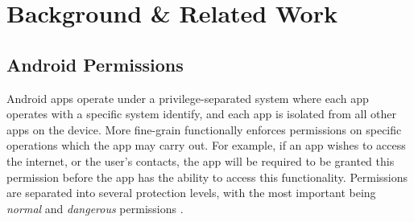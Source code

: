 \documentclass{sig-alternate-05-2015}
\newcommand{\todo}[1]{\textcolor{cyan}{\textbf{[#1]}}}
\newcommand{\pkm}[1]{\textcolor{magenta}{{\it [Pradeep: #1]}}}
\begin{document}













\section{Background \& Related Work}
\label{sec:relatedworks}


\subsection{Android Permissions}


Android apps operate under a privilege-separated system where each app
operates with a specific system identify, and each app is isolated
from all other apps on the device. More fine-grain functionally
enforces permissions on specific operations which the app may carry
out. For example, if an app wishes to access the internet, or the
user's contacts, the app will be required to be granted this
permission before the app has the ability to access this
functionality. Permissions are separated into several protection
levels, with the most important being \emph{normal} and
\emph{dangerous} permissions \cite{android_permissions_URL}.


\end{document}
